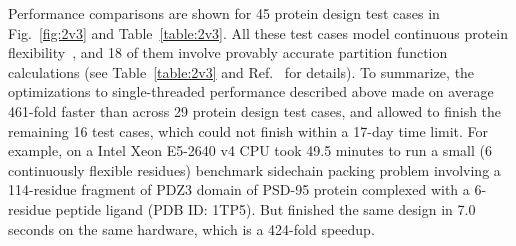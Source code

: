Performance comparisons are shown for 45 protein design test cases in Fig.~\ref{fig:2v3} and Table~\ref{table:2v3}.  All these test cases model continuous protein flexibility~\cite{minDEE,iMinDEE,EPIC}, and 18 of them involve provably accurate partition function calculations (see Table~\ref{table:2v3} and Ref.~ for details).  To summarize, the optimizations to single-threaded performance described above made  on average 461-fold faster than  across 29 protein design test cases, and allowed  to finish the remaining 16 test cases, which  could not finish within a 17-day time limit.  For example,  on a Intel Xeon E5-2640 v4 CPU took 49.5 minutes to run a small (6 continuously flexible residues) benchmark sidechain packing problem involving a 114-residue fragment of PDZ3 domain of PSD-95 protein complexed with a 6-residue peptide ligand (PDB ID: 1TP5).  But  finished the same design in 7.0 seconds on the same hardware, which is a 424-fold speedup.  

